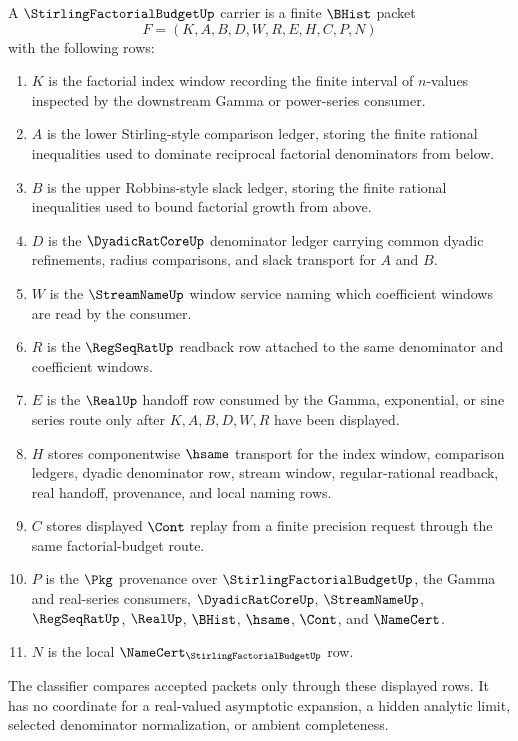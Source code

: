 \begin{definition}
\label{def:stirling-factorial-budget-carrier}
A $\StirlingFactorialBudgetUp$ carrier is a finite $\BHist$ packet
$$
F=(K,A,B,D,W,R,E,H,C,P,N)
$$
with the following rows:
\begin{enumerate}
\item $K$ is the factorial index window recording the finite interval of $n$-values inspected by the downstream Gamma or power-series consumer.
\item $A$ is the lower Stirling-style comparison ledger, storing the finite rational inequalities used to dominate reciprocal factorial denominators from below.
\item $B$ is the upper Robbins-style slack ledger, storing the finite rational inequalities used to bound factorial growth from above.
\item $D$ is the $\DyadicRatCoreUp$ denominator ledger carrying common dyadic refinements, radius comparisons, and slack transport for $A$ and $B$.
\item $W$ is the $\StreamNameUp$ window service naming which coefficient windows are read by the consumer.
\item $R$ is the $\RegSeqRatUp$ readback row attached to the same denominator and coefficient windows.
\item $E$ is the $\RealUp$ handoff row consumed by the Gamma, exponential, or sine series route only after $K,A,B,D,W,R$ have been displayed.
\item $H$ stores componentwise $\hsame$ transport for the index window, comparison ledgers, dyadic denominator row, stream window, regular-rational readback, real handoff, provenance, and local naming rows.
\item $C$ stores displayed $\Cont$ replay from a finite precision request through the same factorial-budget route.
\item $P$ is the $\Pkg$ provenance over $\StirlingFactorialBudgetUp$, the Gamma and real-series consumers, $\DyadicRatCoreUp$, $\StreamNameUp$, $\RegSeqRatUp$, $\RealUp$, $\BHist$, $\hsame$, $\Cont$, and $\NameCert$.
\item $N$ is the local $\NameCert_{\StirlingFactorialBudgetUp}$ row.
\end{enumerate}
The classifier compares accepted packets only through these displayed rows. It has no coordinate for a real-valued asymptotic expansion, a hidden analytic limit, selected denominator normalization, or ambient completeness.
\end{definition}

